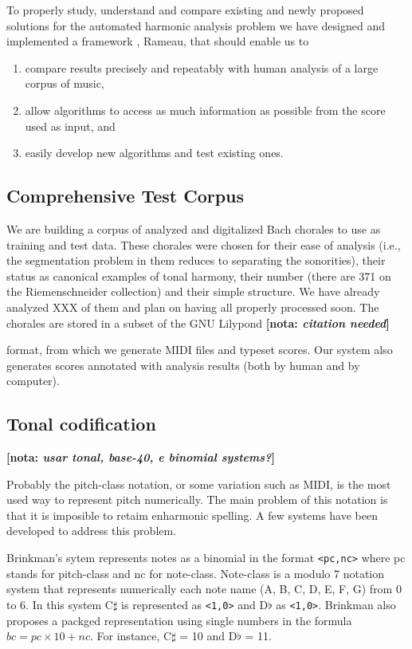 \documentclass{article}
\newcommand{\nota}[1]{
  \textbf{[nota: \textit{#1}]}
}
\begin{document}
To properly study, understand and compare existing and newly proposed
solutions for the automated harmonic analysis problem we have designed
and implemented a framework , Rameau, that should enable us to

\begin{enumerate}
\item compare results precisely and repeatably with human analysis of
  a large corpus of music,
\item allow algorithms to access as much information as possible from
  the score used as input, and
\item easily develop new algorithms and test existing ones.
\end{enumerate}

\subsection{Comprehensive Test Corpus}
\label{sec:comprehensive-test-corpus}

We are building a corpus of analyzed and digitalized Bach chorales to
use as training and test data. These chorales were chosen for their
ease of analysis (i.e., the segmentation problem in them reduces to
separating the sonorities), their status as canonical examples of
tonal harmony, their number (there are 371 on the Riemenschneider
collection) and their simple structure. We have already analyzed XXX
of them and plan on having all properly processed soon. The chorales
are stored in a subset of the GNU Lilypond \nota{citation needed}
format, from which we generate MIDI files and typeset scores. Our
system also generates scores annotated with analysis results (both by
human and by computer).

\subsection{Tonal codification}
\label{sec:codificacao-jamary}

\nota{usar tonal, base-40, e binomial systems?}

Probably the pitch-class notation, or some variation such as MIDI, is
the most used way to represent pitch numerically. The main problem of
this notation is that it is imposible to retaim enharmonic spelling. A
few systems have been developed to address this problem. 

Brinkman's sytem \cite{brinkman86:_binom_repres_of_pitch_for}
represents notes as a binomial in the format \texttt{<pc,nc>} where pc
stands for pitch-class and nc for note-class. Note-class is a modulo 7
notation system that represents numerically each note name (A, B, C,
D, E, F, G) from 0 to 6. In this system C$\sharp$ is represented as
\texttt{<1,0>} and D$\flat$ as \texttt{<1,0>}. Brinkman also proposes
a packged representation using single numbers in the formula $bc =
pc\times10 + nc$. For instance, C$\sharp$ = 10 and D$\flat$ = 11.
\end{document}
